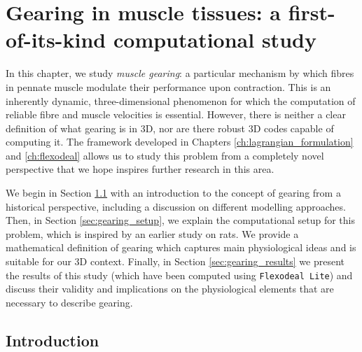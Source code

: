 \documentclass{sfuthesis}
\numberwithin{equation}{section}
\numberwithin{figure}{chapter}
\numberwithin{table}{chapter}
\theoremstyle{definition}
\begin{document}
\chapter{Gearing in muscle tissues: a first-of-its-kind computational study} \label{ch:gearing}


In this chapter, we study \textit{muscle gearing}: a particular mechanism by which fibres in pennate muscle modulate their performance upon contraction. This is an inherently dynamic, three-dimensional phenomenon \cite{RobertsEtAl2019MutiScale3DNature} for which the computation of reliable fibre and muscle velocities is essential. However, there is neither a clear definition of what gearing is in 3D, nor are there robust 3D codes capable of computing it.
The framework developed in Chapters \ref{ch:lagrangian_formulation} and \ref{ch:flexodeal} allows us to study this problem from a completely novel perspective that we hope inspires further research in this area.

We begin in Section \ref{sec:gearing_introduction} with an introduction to the concept of gearing from a historical perspective, including a discussion on different modelling approaches. Then, in Section \ref{sec:gearing_setup}, we explain the computational setup for this problem, which is inspired by an earlier study on rats. We provide a mathematical definition of gearing which captures main physiological ideas and is suitable for our 3D context. Finally, in Section \ref{sec:gearing_results} we present the results of this study (which have been computed using \texttt{Flexodeal Lite}) and discuss their validity and implications on the physiological elements that are necessary to describe gearing.

\section{Introduction} \label{sec:gearing_introduction}

\end{document}
